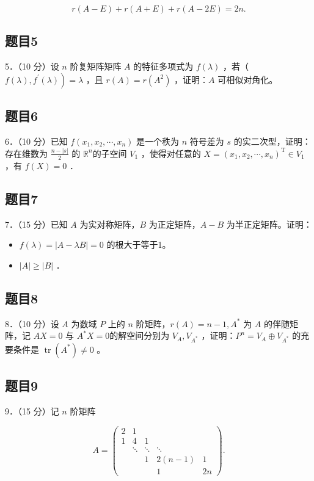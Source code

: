 \documentclass{article}
\begin{document}
\[
r(A-E)+r(A+E)+r(A-2 E)=2 n .
\]

\subsection{题目5}
5．（10 分）设 \(n\) 阶复矩阵矩阵 \(A\) 的特征多项式为 \(f(\lambda)\) ，若（ \(\left.f(\lambda), f^{\prime}(\lambda)\right)=\lambda\) ，且 \(r(A)=r\left(A^{2}\right)\) ，证明：\(A\) 可相似对角化。

\subsection{题目6}
6．（10 分）已知 \(f\left(x_{1}, x_{2}, \cdots, x_{n}\right)\) 是一个秩为 \(n\) 符号差为 \(s\) 的实二次型，证明：存在维数为 \(\frac{n-|s|}{2}\) 的 \(\mathbb{R}^{n}\)的子空间 \(V_{1}\) ，使得对任意的 \(X=\left(x_{1}, x_{2}, \cdots, x_{n}\right)^{\mathrm{T}} \in V_{1}\) ，有 \(f(X)=0\) ．

\subsection{题目7}
7．（15 分）已知 \(A\) 为实对称矩阵，\(B\) 为正定矩阵，\(A-B\) 为半正定矩阵。证明：

\begin{itemize}
  \item[（1）] \(f(\lambda)=|A-\lambda B|=0\) 的根大于等于1。
  \item[（2）] \(|A| \geq|B|\) ．
\end{itemize}

\subsection{题目8}
8．（10 分）设 \(A\) 为数域 \(P\) 上的 \(n\) 阶矩阵，\(r(A)=n-1, A^{*}\) 为 \(A\) 的伴随矩阵，记 \(A X=0\) 与 \(A^{*} X=0\)的解空间分别为 \(V_{A}, V_{A^{*}}\) ，证明：\(P^{n}=V_{A} \oplus V_{A^{*}}\) 的充要条件是 \(\operatorname{tr}\left(A^{*}\right) \neq 0\) 。

\subsection{题目9}
9．（15 分）记 \(n\) 阶矩阵

\[
A=\left(\begin{array}{ccccc}
2 & 1 & & & \\
1 & 4 & 1 & & \\
& \ddots & \ddots & \ddots & \\
& & 1 & 2(n-1) & 1 \\
& & & 1 & 2 n
\end{array}\right) .
\]
\end{document}
